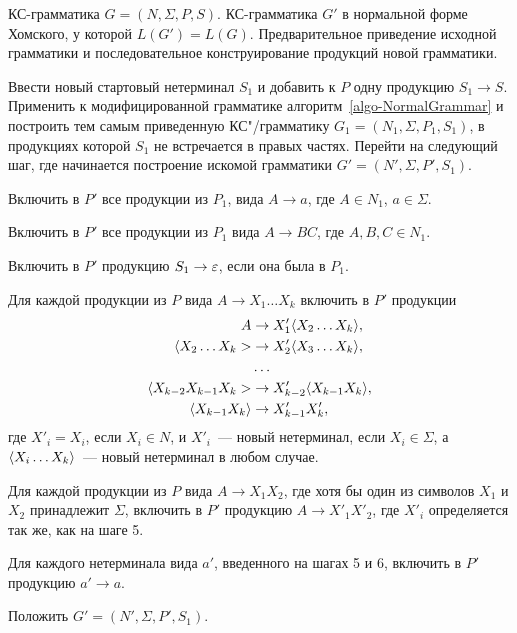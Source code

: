 {\label{algo-Homsky}КС-грамматика $G=(N,\Sigma,P,S)$.}
{КС-грамматика $G'$ в нормальной форме Хомского, у которой $L(G')=L(G)$.}
{Предварительное приведение исходной грамматики и последовательное конструирование продукций новой грамматики.}
{
\item
Ввести новый стартовый нетерминал $S_1$ и добавить к $P$ одну продукцию $S_1\to S$. Применить к модифицированной грамматике алгоритм~\ref{algo-NormalGrammar} и построить тем самым приведенную КС"/грамматику $G_1=(N_1,\Sigma,P_1,S_1)$, в продукциях которой $S_1$ не встречается в правых частях. Перейти на следующий шаг, где начинается построение искомой грамматики $G'=(N',\Sigma,P',S_1)$.

\item Включить в $P'$ все продукции из $P_1$, вида $A\to a$, где $A\in N_1$, $a\in\Sigma$.

\item Включить в $P'$ все продукции из $P_1$ вида $A\to BC$, где $A,B,C\in N_1$.

\item Включить в $P'$ продукцию $S_1\to\varepsilon$, если она была в $P_1$.

\item Для каждой продукции из $P$ вида $A\to X_1 \ldots X_k$ включить в $P'$ продукции
\begin{align*}
    A  &\to X'_1 \langle X_2\ldots X_k \rangle, \\
    \langle X_2 \ldots X_k> &\to X'_2 \langle X_3\ldots X_k \rangle, \\
     & \ldots\\
    \langle X_{k-2} X_{k-1} X_k> &\to X'_{k-2} \langle X_{k-1} X_k \rangle, \\
    \langle X_{k-1} X_k \rangle &\to X'_{k-1} X'_k,
\end{align*}
где $X'_i=X_i$, если $X_i\in N$, и $X'_i$~--- новый нетерминал,
если $X_i\in\Sigma$, а $\langle X_i\ldots X_k \rangle$~--- новый нетерминал в
любом случае.

\item Для каждой продукции из $P$ вида $A\to X_1X_2$, где хотя бы один из символов $X_1$ и $X_2$ принадлежит $\Sigma$, включить в $P'$ продукцию $A\to X'_1X'_2$, где $X'_i$ определяется так же, как на шаге 5.

\item Для каждого нетерминала вида $a'$, введенного на шагах 5 и 6, включить в $P'$ продукцию $a'\to a$.

\item Положить $G'=(N',\Sigma,P',S_1)$.
}

